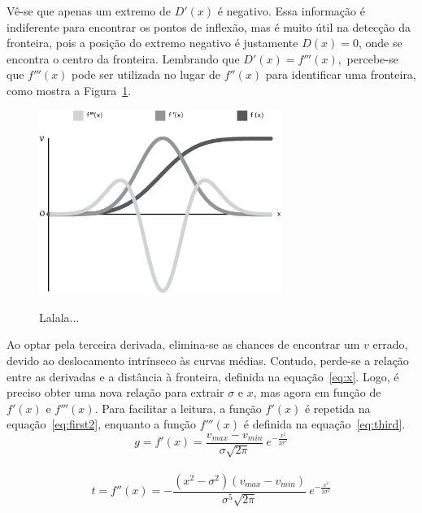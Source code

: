 	Vê-se que apenas um extremo de $ D'(x) $ é negativo. Essa informação é indiferente para encontrar os pontos de inflexão, mas é muito útil na detecção da fronteira, pois a posição do extremo negativo é justamente $ D(x) = 0 $, onde se encontra o centro da fronteira. Lembrando que $ D'(x) = f'''(x), $ percebe-se que $ f'''(x) $ pode ser utilizada no lugar de $ f''(x) $ para identificar uma fronteira, como mostra a Figura~\ref{fig:m_functions}.
	
\begin{figure}[h]
	\centering
	\includegraphics[width=0.7\textwidth]{images/m_functions}
	\label{fig:m_functions}
	\caption{Lalala...}
\end{figure}
	
	Ao optar pela terceira derivada, elimina-se as chances de encontrar um $ v $ errado, devido ao deslocamento intrínseco às curvas médias. Contudo, perde-se a relação entre as derivadas e a distância à fronteira, definida na equação~\eqref{eq:x}. Logo, é preciso obter uma nova relação para extrair $ \sigma $ e $ x $, mas agora em função de $ f'(x) $ e $ f'''(x) $. Para facilitar a leitura, a função $ f'(x) $ é repetida na equação~\eqref{eq:first2}, enquanto a função $ f'''(x) $ é definida na equação~\eqref{eq:third}.
	\\
	
\begin{equation} \label{eq:first2}
	g = f'(x) = \frac{v_{max} - v_{min}}{\sigma\sqrt{2\pi}}\ e^{-\frac{x^{2}}{2\sigma^{2}}}
\end{equation} \\
	
\begin{equation} \label{eq:third}
	t = f''(x) = -\frac{(x^{2} - \sigma^{2})(v_{max} - v_{min})}{\sigma^{5}\sqrt{2\pi}}\ e^{-\frac{x^{2}}{2\sigma^{2}}}
\end{equation} \\

